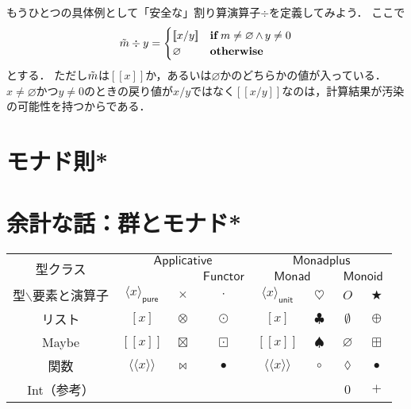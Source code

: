 \documentclass[twocolumn]{jsbook}
\def\[{[\![}
\def\]{]\!]}
\newcommand{\hsklTypeclass}[1]{\mathsf{#1}}
\DeclareMathOperator{\hsklApplicativeMap}{\times}
\DeclareMathOperator{\hsklApplicativeListMap}{\otimes}
\DeclareMathOperator{\hsklApplicativeMaybeMap}{\boxtimes}
\DeclareMathOperator{\hsklFmap}{\cdot}
\DeclareMathOperator{\hsklMap}{\odot}
\DeclareMathOperator{\hsklMaybeAppend}{\boxplus}
\DeclareMathOperator{\hsklMaybeMap}{\boxdot}
\DeclareMathOperator{\hsklMonadMap}{\heartsuit}
\newcommand{\hsklAppend}{\oplus}
\newcommand{\hsklApplicative}{\hsklTypeclass{Applicative}}
\newcommand{\hsklEmptyList}{\emptyset}
\newcommand{\hsklFunctor}{\hsklTypeclass{Functor}}
\newcommand{\hsklMonad}{\hsklTypeclass{Monad}}
\newcommand{\hsklMonadplus}{\hsklTypeclass{Monadplus}}
\newcommand{\hsklMonoid}{\hsklTypeclass{Monoid}}
\newcommand{\hsklNothing}{\varnothing}
\newcommand{\hsklJust}[1]{\[#1\]}
\newcommand{\hsklMaybe}[1]{\Tilde{#1}}
\newcommand{\hsklPure}[1]{\langle#1\rangle_\textsf{pure}}
\newcommand{\hsklUnit}[1]{\langle#1\rangle_\textsf{unit}}
\newcommand{\mathKeyword}[1]{\mathbf{#1}}
\DeclareMathOperator{\mathAnyBinaryOperator}{\bigstar}
\DeclareMathOperator{\mathAnd}{\wedge}
\DeclareMathOperator{\mathCompose}{\bullet}
\DeclareMathOperator{\mathIf}{\mathKeyword{if}}
\newcommand{\mathLambdaAnonymousParameter}{\lozenge}
\newcommand{\mathOtherwise}{\mathKeyword{otherwise}}
\begin{document}
もうひとつの具体例として「安全な」割り算演算子$\div$を定義してみよう．
ここで
\begin{equation*}
\hsklMaybe{m}\div y=\begin{cases}\hsklJust{x/y}&\mathIf m\neq\hsklNothing\mathAnd y\neq0\\
\hsklNothing&\mathOtherwise\end{cases}
\end{equation*}
とする．
ただし$\hsklMaybe{m}$は$\hsklJust{x}$か，あるいは$\hsklNothing$かのどちらかの値が入っている．
$x\neq\hsklNothing$かつ$y\neq0$のときの戻り値が$x/y$ではなく$\hsklJust{x/y}$なのは，計算結果が汚染の可能性を持つからである．



\section{モナド則*}

\section*{余計な話：群とモナド*}


\begin{table*}
\begin{center}
\begin{tabular}{||c||c|c|c|c|c|c|c||}
\hline
\multirow{2}{*}{型クラス}
    &\multicolumn{3}{|c|}{$\hsklApplicative$}
    &\multicolumn{4}{|c||}{$\hsklMonadplus$}\\
\cline{4-8}
\multirow{1}{*}{}
    &\multicolumn{2}{|c|}{ }
    &$\hsklFunctor$
    &\multicolumn{2}{|c}{$\hsklMonad$}
    &\multicolumn{2}{|c||}{$\hsklMonoid$}\\
\hline\hline
型$\backslash$要素と演算子
    &$\hsklPure{x}$
    &$\hsklApplicativeMap$
    &$\hsklFmap$
    &$\hsklUnit{x}$
    &$\hsklMonadMap$
    &$O$
    &$\mathAnyBinaryOperator$\\
\hline
リスト
    &$[x]$
    &$\hsklApplicativeListMap$
    &$\hsklMap$
    &$[x]$
    &$\clubsuit$
    &$\hsklEmptyList$
    &$\hsklAppend$\\
\hline
Maybe
    &$\hsklJust{x}$
    &$\hsklApplicativeMaybeMap$
    &$\hsklMaybeMap$
    &$\hsklJust{x}$
    &$\spadesuit$
    &$\hsklNothing$
    &$\hsklMaybeAppend$\\
\hline
関数
    &$\langle\!\langle x\rangle\!\rangle$
    &$\bowtie$
    &$\mathCompose$
    &$\langle\!\langle x\rangle\!\rangle$
    &$\circ$
    &$\mathLambdaAnonymousParameter$
    &$\mathCompose$\\
\hline
Int（参考）
    &
    &
    &
    &
    &
    &$0$
    &$+$\\
\hline
\end{tabular}
\end{center}
\end{table*}
\end{document}
